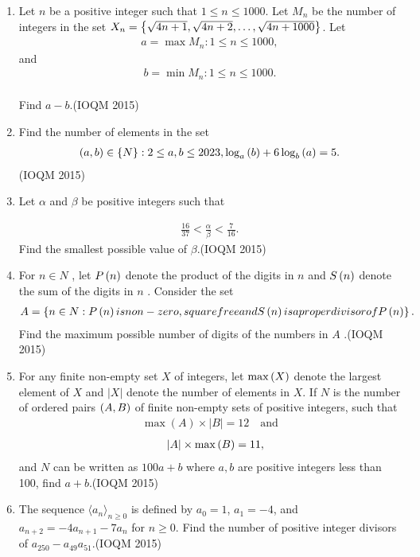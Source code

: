 \begin{enumerate}
    \item Let $n$ be a positive integer such that $1 \leq n \leq 1000$. Let $M_n$ be the number of integers in the set 
	    $X_n =  \left\{ \sqrt{4n+1}, \sqrt{4n+2}, \ldots, \sqrt{4n+1000} \right\}$.
		Let 
		\begin{align}
a = \max{M_n : 1 \leq n \leq 1000},
		\end{align}
	and	\begin{align}
b = \min{M_n : 1 \leq n \leq 1000}.		
		\end{align}
		\\Find $a - b$.\hfill(IOQM 2015)
    
    \item Find the number of elements in the set
	    \begin{align}
   \left(a, b\right) \in \left\{N\right\} : 2 \leq a, b \leq 2023, \log_a \left(b\right) + 6 \log_b \left(a\right) = 5.
	    \end{align}\hfill(IOQM 2015)


    \item Let $\alpha$ and $\beta$ be positive integers such that 

	    \begin{align}
\frac{16}{37} < \frac{\alpha}{\beta} < \frac{7}{16}.
	    \end{align}
 Find the smallest possible value of $\beta$.\hfill(IOQM 2015)
    
    \item For $n \in N$ , let $P\left(n\right)$ denote the product of the digits in $n$ and $S\left(n\right)$ denote the sum of the digits in $n$ . Consider the set 
	    \begin {align}
		A =  \left\{ n \in N : P\left(n\right)  is  non-zero, square  free  and  S\left(n\right)  is  a  proper  divisor   of   P\left(n\right) \right\}.
		\end {align}
Find the maximum possible number of digits of the numbers in $A$ .\hfill(IOQM 2015)
    
    \item For any finite non-empty set $X$ of integers, let $\max\left(X\right)$ denote the largest element of $X$ and $|X|$ denote the number of elements in $X$. If $N$ is the number of ordered pairs $\left(A, B\right)$ of finite non-empty sets of positive integers, such that
	    \begin{align}
\max(A) \times |B| = 12 \quad \text{and}
	    \end{align}
		\begin{align}
			\quad |A| \times \max\left(B\right) = 11,
		\end{align}
 and $N$ can be written as $100a + b$ where $a, b$ are positive integers less than 100, find $a + b$.\hfill(IOQM 2015)
 \item The sequence $\langle a_n \rangle_{n \geq 0}$ is defined by $a_0 = 1$, $a_1 = -4$, and $a_{n+2} = -4a_{n+1} - 7a_n$ for $n \geq 0$. Find the number of positive integer divisors of $a_{250} - a_{49} a_{51}$.\hfill(IOQM 2015)
    

\end{enumerate}
